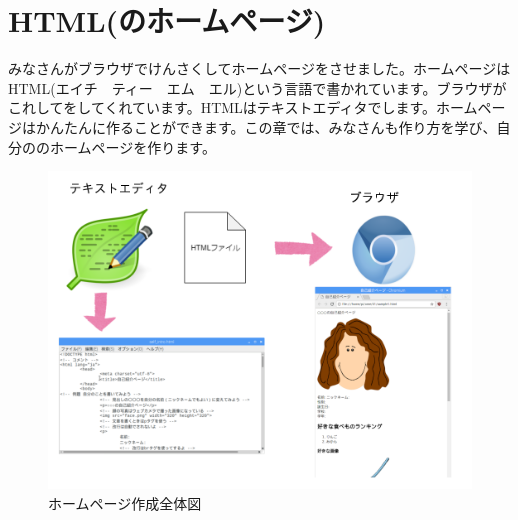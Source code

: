 \clearpage
\section{HTML(のホームページ)}
みなさんがブラウザでけんさくしてホームページをさせました。ホームページはHTML(エイチ　ティー　エム　エル)という言語で書かれています。ブラウザがこれしてをしてくれています。HTMLはテキストエディタでします。ホームページはかんたんに作ることができます。この章では、みなさんも作り方を学び、自分ののホームページを作ります。


\bigskip


\bigskip


\bigskip


\bigskip



\begin{figure}[hb]
  \centering
  \begin{minipage}{15.801cm}
    {\upshape
      \includegraphics[width=15.801cm]{text01-img/textbook-img140.png}
      \caption{ホームページ作成全体図}
    }
  \end{minipage}
\end{figure}
\clearpage

